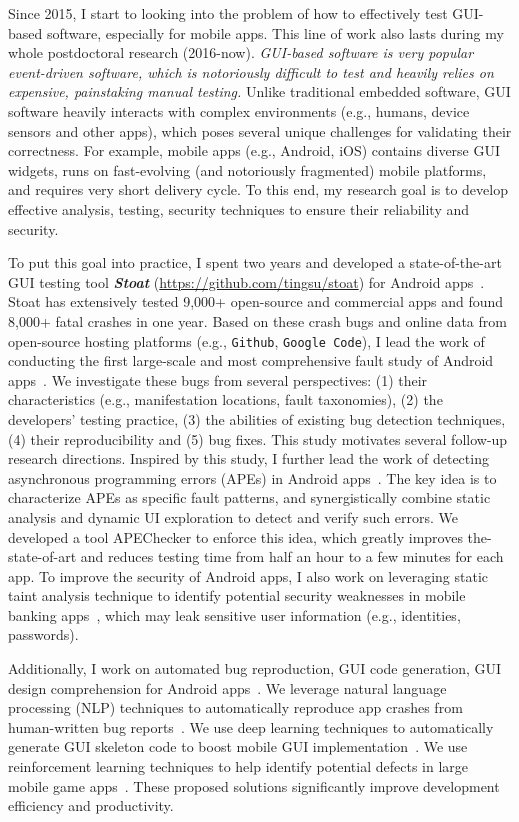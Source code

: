 \documentclass[a4paper]{article}
\begin{document}
Since 2015, I start to looking into the problem of how to effectively test GUI-based software, especially for mobile apps. This line of work also lasts during my whole postdoctoral research (2016-now). \emph{GUI-based software is very popular event-driven software, which is notoriously difficult to test and heavily relies on expensive, painstaking manual testing.}
Unlike traditional embedded software, GUI software heavily interacts with complex environments (e.g., humans, device sensors and other apps), which poses several unique challenges for validating their correctness.
For example, mobile apps (e.g., Android, iOS) contains diverse GUI widgets, runs on fast-evolving (and notoriously fragmented) mobile platforms, and requires very short delivery cycle. To this end, my research goal is to develop effective analysis, testing, security techniques to ensure their reliability and security.

To put this goal into practice, I spent two years and developed a state-of-the-art GUI testing tool \emph{\textbf{Stoat}} (\url{https://github.com/tingsu/stoat}) for Android apps~\cite{stoat}. Stoat has extensively tested 9,000+ open-source and commercial apps and found 8,000+ fatal crashes in one year. 
Based on these crash bugs and online data from open-source hosting platforms (e.g., \texttt{Github}, \texttt{Google Code}), I lead the work of conducting the first large-scale and most comprehensive fault study of Android apps~\cite{study,study2}. We investigate these bugs from several perspectives: (1)
their characteristics (e.g., manifestation locations, fault taxonomies), (2) the developers’ testing practice, (3) the abilities of existing bug
detection techniques, (4) their reproducibility and (5) bug fixes. This study motivates several follow-up research directions.
Inspired by this study, I further lead the work of detecting asynchronous programming errors (APEs) in Android apps~\cite{apechecker}. The key idea is to characterize APEs as specific fault patterns, and synergistically combine static analysis and dynamic UI exploration to detect and verify such errors.
We developed a tool APEChecker to enforce this idea, which greatly improves the-state-of-art and reduces testing time from half an hour to a few minutes for each app. 
To improve the security of Android apps, I also work on leveraging static taint analysis technique to identify potential security weaknesses in mobile banking apps~\cite{ausera}, which may leak sensitive user information (e.g., identities, passwords).

Additionally, I work on automated bug reproduction, GUI code generation, GUI design comprehension for Android apps~\cite{recdroid,ui2code,storydroid}.
We leverage natural language processing (NLP) techniques to automatically reproduce app crashes from human-written bug reports~\cite{recdroid}.
We use deep learning techniques to automatically generate GUI skeleton code to boost mobile GUI implementation~\cite{ui2code}.
We use reinforcement learning techniques to help identify potential defects in large mobile game apps~\cite{wuji}.
These proposed solutions significantly improve development efficiency and productivity.
\end{document}
